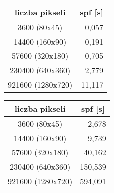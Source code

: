 \begin{figure}[!htb]
\advance\leftskip-2cm
\begin{subfigure}{.5\textwidth}
\end{subfigure}
\hspace{2cm}
\begin{subfigure}{.5\textwidth}
		\begin{longtable}{|c|r|} \hline
	    liczba pikseli & \multicolumn{1}{|c|}{spf [s]} \\ \hline
	    3600 (80x45) & 0,057 \\ 
	    14400 (160x90) & 0,191 \\
		57600 (320x180) & 0,705 \\
		230400 (640x360) & 2,779 \\
		921600 (1280x720) & 11,117 \\
		\hline
		\end{longtable}
\end{subfigure}
\end{figure}

\begin{figure}[!htb]
\advance\leftskip-2cm
\begin{subfigure}{.5\textwidth}
\end{subfigure}
\hspace{2cm}
\begin{subfigure}{.5\textwidth}
		\begin{longtable}{|c|r|} \hline
	    liczba pikseli & \multicolumn{1}{|c|}{spf [s]} \\ \hline
	    3600 (80x45) & 2,678 \\ 
	    14400 (160x90) & 9,739 \\
		57600 (320x180) & 40,162 \\
		230400 (640x360) & 150,539 \\
		921600 (1280x720) & 594,091 \\
		\hline
		\end{longtable}
\end{subfigure}
\end{figure}


